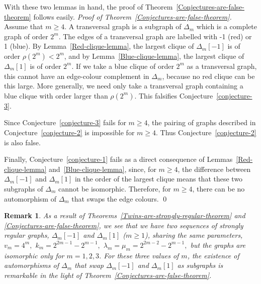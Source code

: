 \documentclass[12pt,a4paper]{article}
\newtheorem*{remark}{Remark}
\newenvironment{proofof}[1]{\noindent\emph{Proof of #1.}}{\qed}
\begin{document}
With these two lemmas in hand, the proof of Theorem~\ref{Conjectures-are-false-theorem} follows easily.
\begin{proofof}{Theorem~\ref{Conjectures-are-false-theorem}}
Assume that $m \geqslant 4$.
A transversal graph is a subgraph of $\varDelta_m$ which is a complete graph of order $2^m$.
The edges of a transversal graph are labelled with -1 (red) or 1 (blue).
By Lemma~\ref{Red-clique-lemma}, the largest clique of $\varDelta_m[-1]$ is of order $\rho(2^m) < 2^m$,
and by Lemma~\ref{Blue-clique-lemma}, the largest clique of $\varDelta_m[1]$ is of order $2^m$.
If we take a blue clique of order $2^m$ as a transversal graph, this cannot have an edge-colour complement
in $\varDelta_m$, because no red clique can be this large.
More generally, we need only take a transversal graph containing a blue clique with order larger than $\rho(2^m)$.
This falsifies Conjecture~\ref{conjecture-3}.

Since Conjecture~\ref{conjecture-3} fails for $m \geqslant 4$, 
the pairing of graphs described in Conjecture~\ref{conjecture-2} is impossible for $m \geqslant 4$.
Thus Conjecture~\ref{conjecture-2} is also false.

Finally, Conjecture~\ref{conjecture-1} fails as a direct consequence of Lemmas~\ref{Red-clique-lemma} and~\ref{Blue-clique-lemma},
since, for $m \geqslant 4$, the difference between $\varDelta_m[-1]$  and $\varDelta_m[1]$ in the order of the largest clique
means that these two subgraphs of $\varDelta_m$ cannot be isomorphic.
Therefore, for $m \geqslant 4$,  there can be no automorphism of $\varDelta_m$ that swaps the edge colours. 
\end{proofof}

\begin{remark}
As a result of Theorems~\ref{Twins-are-strongly-regular-theorem} and \ref{Conjectures-are-false-theorem},
we see that we have two sequences of strongly regular graphs, $\varDelta_m[-1]$ and $\varDelta_m[1]$ ($m \geqslant 1$),
sharing the same parameters, 
$v_m = 4^m,$ $k_m = 2^{2 m - 1} - 2^{m - 1},$ $\lambda_m=\mu_m=2^{2 m - 2} - 2^{m - 1},$
but the graphs are isomorphic only for $m=1, 2, 3$.
For these three values of $m$, the existence of
automorphisms of $\varDelta_m$ that swap $\varDelta_m[-1]$ and $\varDelta_m[1]$ 
as subgraphs \cite[Table 1]{Leo14Constructions}
is remarkable in the light of Theorem~\ref{Conjectures-are-false-theorem}.
\end{remark}

\end{document}
